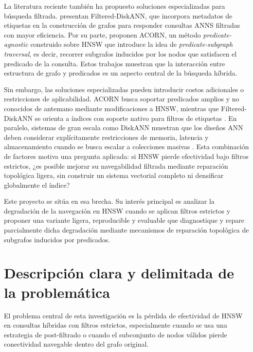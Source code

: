 La literatura reciente también ha propuesto soluciones especializadas para búsqueda filtrada. \textcite{gollapudi2023filtered} presentan Filtered-DiskANN, que incorpora metadatos de etiquetas en la construcción de grafos para responder consultas ANNS filtradas con mayor eficiencia. Por su parte, \textcite{patel2024acorn} proponen ACORN, un método \textit{predicate-agnostic} construido sobre HNSW que introduce la idea de \textit{predicate-subgraph traversal}, es decir, recorrer subgrafos inducidos por los nodos que satisfacen el predicado de la consulta. Estos trabajos muestran que la interacción entre estructura de grafo y predicados es un aspecto central de la búsqueda híbrida.

Sin embargo, las soluciones especializadas pueden introducir costos adicionales o restricciones de aplicabilidad. ACORN busca soportar predicados amplios y no conocidos de antemano mediante modificaciones a HNSW, mientras que Filtered-DiskANN se orienta a índices con soporte nativo para filtros de etiquetas \parencite{patel2024acorn,gollapudi2023filtered}. En paralelo, sistemas de gran escala como DiskANN muestran que los diseños ANN deben considerar explícitamente restricciones de memoria, latencia y almacenamiento cuando se busca escalar a colecciones masivas \parencite{subramanya2019diskann}. Esta combinación de factores motiva una pregunta aplicada: si HNSW pierde efectividad bajo filtros estrictos, ¿es posible mejorar su navegabilidad filtrada mediante reparación topológica ligera, sin construir un sistema vectorial completo ni densificar globalmente el índice?

Este proyecto se sitúa en esa brecha. Su interés principal es analizar la degradación de la navegación en HNSW cuando se aplican filtros estrictos y proponer una variante ligera, reproducible y evaluable que diagnostique y repare parcialmente dicha degradación mediante mecanismos de reparación topológica de subgrafos inducidos por predicados.

\section{Descripción clara y delimitada de la problemática}

El problema central de esta investigación es la pérdida de efectividad de HNSW en consultas híbridas con filtros estrictos, especialmente cuando se usa una estrategia de post-filtrado o cuando el subconjunto de nodos válidos pierde conectividad navegable dentro del grafo original.

